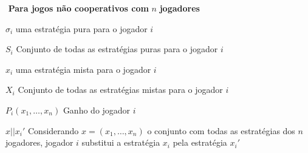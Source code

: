 \begin{simbolos}
	\item[$ $] \textbf{Para jogos não cooperativos com }$n$\textbf{ jogadores}
	\item[$ \sigma_i $] uma estratégia pura para o jogador $i$
	\item[$ S_i $] Conjunto de todas as estratégias puras para o jogador $i$
	\item[$ x_i $] uma estratégia mista para o jogador $i$
	\item[$ X_i $] Conjunto de todas as estratégias mistas para o jogador $i$
	\item[$ P_i(x_1,\ldots,x_n) $] Ganho do jogador $i$
	\item[$ x||x_{i}' $] Considerando $x = (x_1,\ldots,x_n)$ o conjunto com todas as estratégias dos $n$ jogadores, jogador $i$ substitui a estratégia $x_i$ pela estratégia $x_{i}'$

\end{simbolos}
